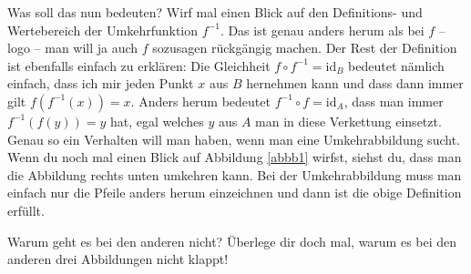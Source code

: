 \documentclass[a4paper,ngerman,12pt]{zirkelblatt1415}
\theoremstyle{definition}
\theoremstyle{remark}
\begin{document}
Was soll das nun bedeuten? Wirf mal einen Blick auf den Definitions- und Wertebereich der Umkehrfunktion $f^{-1}$.
Das ist genau anders herum als bei $f$ -- logo --  man will ja auch $f$ sozusagen rückgängig machen.
Der Rest der Definition ist ebenfalls einfach zu erklären:
Die Gleichheit $f\circ f^{-1} = \text{id}_B$ bedeutet nämlich einfach, dass ich mir jeden Punkt $x$ aus $B$ hernehmen kann 
und dass dann immer gilt $f ( f^{-1}(x)) = x$.
Anders herum bedeutet $f^{-1}\circ f = \text{id}_A$, dass man immer $f^{-1} ( f(y)) = y$ hat, egal welches $y$ aus $A$ man in diese 
Verkettung einsetzt.
Genau so ein Verhalten will man haben, wenn man eine Umkehrabbildung sucht.
Wenn du noch mal einen Blick auf Abbildung \ref{abbb1} wirfst, siehst du, dass man die Abbildung rechts unten umkehren kann.
Bei der Umkehrabbildung muss man einfach nur die Pfeile anders herum einzeichnen und dann ist die obige Definition erfüllt.

\begin{aufgabe}{Warum geht es bei den anderen nicht?}
Überlege dir doch mal, warum es bei den anderen drei Abbildungen nicht klappt!
\end{aufgabe}
% 
% 
% 
% 
\end{document}

